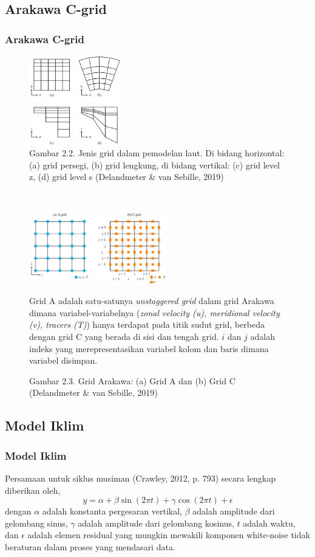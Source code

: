 \documentclass{beamer}
\begin{document}
\subsection{Arakawa C-grid}
\begin{frame}[allowframebreaks]
	\frametitle{Arakawa C-grid}	

	\begin{figure}[H]
	\centering
	\includegraphics[width=4cm]{grid.jpg}
	\captionsetup{labelformat=empty}
	\caption{Gambar 2.2. Jenis grid dalam pemodelan laut. Di bidang horizontal: (a) grid persegi, (b) grid lengkung, di bidang vertikal: (c) grid level z, (d) grid level s (Delandmeter \& van Sebille, 2019)}
	\label{fig:grid}
	\end{figure}
	$\;$ \\
	\begin{figure}[H]
		\centering
		\includegraphics[width=6cm]{arakawa.jpg}
		\captionsetup{labelformat=empty}
		\caption{Gambar 2.3. Grid Arakawa: (a) Grid A dan (b) Grid C (Delandmeter \& van Sebille, 2019)}
			\label{fig:arakawa}
			\tiny
		Grid A adalah satu-satunya \textit{unstaggered grid} dalam grid Arakawa dimana variabel-variabelnya (\textit{zonal velocity (u), meridional velocity (v), tracers (T)}) hanya terdapat pada titik sudut grid, berbeda dengan grid C yang berada di sisi dan tengah grid. $i$ dan $j$ adalah indeks yang merepresentasikan variabel kolom dan baris dimana variabel disimpan.
	\end{figure}	
\end{frame}

\subsection{Model Iklim}
\begin{frame}[allowframebreaks]
	\frametitle{Model Iklim}
	Persamaan untuk siklus musiman (Crawley, 2012, p. 793) secara lengkap diberikan oleh,
	\begin{equation}\label{eq:sm}
		y = \alpha + \beta \sin(2\pi t)+\gamma \cos(2\pi t) + \epsilon
	\end{equation}
	dengan $\alpha$ adalah konstanta pergesaran vertikal, $\beta$ adalah amplitude dari gelombang sinus, $\gamma$ adalah amplitude dari gelombang kosinus, $t$ adalah waktu, dan $\epsilon$ adalah elemen residual yang mungkin mewakili komponen white-noise tidak beraturan dalam proses yang mendasari data.	
\end{frame}
\end{document}
